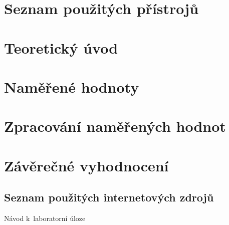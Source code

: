 \documentclass[a4paper,12pt]{article}   %
\begin{document}
\newpage



\section{Seznam použitých přístrojů}
\label{chap:seznam_pristroju}



\section{Teoretický úvod}
\label{chap:teoreticky_uvod}



\section{Naměřené hodnoty}
\label{chap:namerene_hodnoty}



\section{Zpracování naměřených hodnot}
\label{chap:zpracovani_hodnot}



\section{Závěrečné vyhodnocení}
\label{chap:zaver}



\clearpage
\renewcommand{\refname}{Seznam použité literatury a~zdrojů informací} 

\begin{thebibliography}{99}

\subsection*{Seznam použitých internetových zdrojů}
     Návod k~laboratorní úloze
    
\end{thebibliography}
\end{document}
